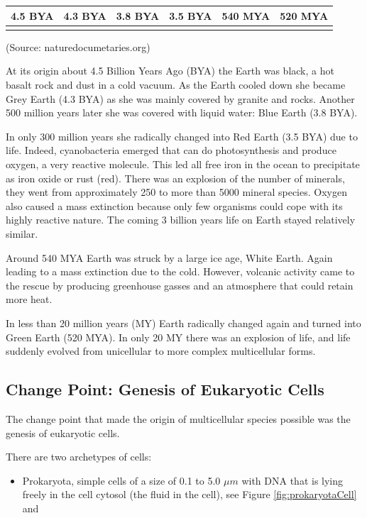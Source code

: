 \documentclass[
  11pt,
]{book}
\providecommand{\tightlist}{%
  \setlength{\itemsep}{0pt}\setlength{\parskip}{0pt}}
\begin{document}
\begin{longtable}[]{@{}llllll@{}}
\toprule()
4.5 BYA & 4.3 BYA & 3.8 BYA & 3.5 BYA & 540 MYA & 520 MYA \\
\midrule()
\endhead
& & & & & \\
\bottomrule()
\end{longtable}

(Source: naturedocumetaries.org)

At its origin about 4.5 Billion Years Ago (BYA) the Earth was black, a hot basalt rock and dust in a cold vacuum.
As the Earth cooled down she became Grey Earth (4.3 BYA) as she was mainly covered by granite and rocks. Another 500 million years later she was covered with liquid water: Blue Earth (3.8 BYA).

In only 300 million years she radically changed into Red Earth (3.5 BYA) due to life. Indeed, cyanobacteria emerged that can do photosynthesis and produce oxygen, a very reactive molecule. This led all free iron in the ocean to precipitate as iron oxide or rust (red). There was an explosion of the number of minerals, they went from approximately 250 to more than 5000 mineral species. Oxygen also caused a mass extinction because only few organisms could cope with its highly reactive nature. The coming 3 billion years life on Earth stayed relatively similar.

Around 540 MYA Earth was struck by a large ice age, White Earth.
Again leading to a mass extinction due to the cold. However, volcanic activity came to the rescue by producing greenhouse gasses and an atmosphere that could retain more heat.

In less than 20 million years (MY) Earth radically changed again and turned into Green Earth (520 MYA). In only 20 MY there was an explosion of life, and life suddenly evolved from unicellular to more complex multicellular forms.

\hypertarget{change-point-genesis-of-eukaryotic-cells}{%
\subsection{Change Point: Genesis of Eukaryotic Cells}\label{change-point-genesis-of-eukaryotic-cells}}

The change point that made the origin of multicellular species possible was the genesis of eukaryotic cells.

There are two archetypes of cells:

\begin{itemize}
\tightlist
\item
  Prokaryota, simple cells of a size of 0.1 to 5.0 \(\mu m\) with DNA that is lying freely in the cell cytosol (the fluid in the cell), see Figure \ref{fig:prokaryotaCell} and
\end{itemize}
\end{document}
